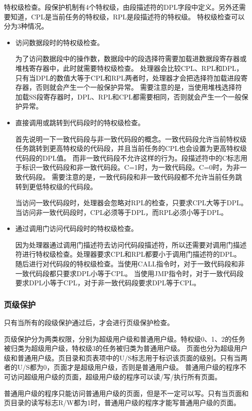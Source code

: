 \documentclass[a4paper,left=2.5cm,right=2.5cm,11pt]{article}
\begin{document}
	特权级检查。段保护机制有4个特权级，由段描述符的DPL字段中定义。另外还需要知道，CPL是当前任务的特权级，RPL是段描述符的特权级。
	特权级检查可以分为3种情况。
	\begin{itemize}
		\item 访问数据段时的特权级检查。\par
			  为了访问数据段中的操作数，数据段中的段选择符需要加载进数据段寄存器或堆栈寄存器中，此时就需要特权级检查。
			  处理器会比较CPL、RPL和DPL，只有当DPL的数值大等于CPL和RPL两者时，处理器才会把选择符加载进段寄存器，否则就会产生一个一般保护异常。
			  需要注意的是，当使用堆栈选择符加载SS段寄存器时，DPL、RPL和CPL都需要相同，否则就会产生一个一般保护异常。
		\item 直接调用或跳转到代码段时的特权级检查。\par
			  首先说明一下一致代码段与非一致代码段的概念。一致代码段允许当前特权级任务跳转到更高特权级的代码段，并且当前任务的CPL也会设置为更高特权级代码段的DPL值。
			  而非一致代码段不允许这样的行为。段描述符中的C标志用于标识一致代码段和非一致代码段。C=1时，为一致代码段。C=0时，为非一致代码段。
			  需要注意的是，一致代码段和非一致代码段都不允许当前任务跳转到更低特权级的代码段。\par
			  当访问一致代码段时，处理器会忽略对RPL的检查，只要求CPL大等于DPL。当访问非一致代码段时，CPL必须等于DPL，而RPL必须小等于DPL。
		\item 通过调用门访问代码段时的特权级检查。\par
			  因为处理器通过调用门描述符去访问代码段描述符，所以还需要对调用门描述符进行特权级检查。处理器要求CPL和RPL都要小于调用门描述符的DPL。
			  随后进行对代码段的特权级检查。当使用CALL指令时，对于一致代码段和非一致代码段都只要求DPL小等于CPL。
			  当使用JMP指令时，对于一致代码段要求DPL小等于CPL，对于非一致代码段要求DPL等于CPL。
	\end{itemize}

\subsubsection{页级保护}
	只有当所有的段级保护通过后，才会进行页级保护检查。\par
	页级保护分为两类权限，分别为超级用户级和普通用户级。特权级0、1、2的任务被归类为超级用户级，特权级3的任务被归类为普通用户级。
	页面也分为超级用户级和普通用户级。页目录和页表项中的U/S标志用于标识该页面的级别。只有当两者的U/S都为0，页面才是超级用户级，否则是普通用户级。
	普通用户级的程序不可访问超级用户级的页面，超级用户级的程序可以读/写/执行所有页面。\par
	普通用户级的程序只能访问普通用户级的页面，但是不一定可以写。只有当页面和页目录的读写标志R/W都为1时，普通用户级的程序才能写普通用户级的页面。
\end{document}
